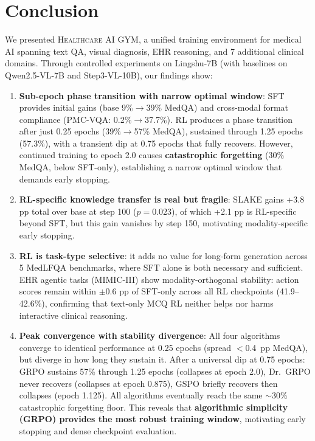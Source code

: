 \documentclass{article}
\newcommand{\gym}{\textsc{Healthcare AI GYM}}
\begin{document}
\section{Conclusion}
\label{sec:conclusion}

We presented \gym{}, a unified training environment for medical AI spanning text QA, visual diagnosis, EHR reasoning, and 7 additional clinical domains. Through controlled experiments on Lingshu-7B (with baselines on Qwen2.5-VL-7B and Step3-VL-10B), our findings show:

\begin{enumerate}[nosep, leftmargin=*]
    \item \textbf{Sub-epoch phase transition with narrow optimal window}: SFT provides initial gains (base 9\%$\to$39\% MedQA) and cross-modal format compliance (PMC-VQA: 0.2\%$\to$37.7\%). RL produces a phase transition after just 0.25 epochs (39\%$\to$57\% MedQA), sustained through 1.25 epochs (57.3\%), with a transient dip at 0.75 epochs that fully recovers. However, continued training to epoch 2.0 causes \textbf{catastrophic forgetting} (30\% MedQA, below SFT-only), establishing a narrow optimal window that demands early stopping.
    \item \textbf{RL-specific knowledge transfer is real but fragile}: SLAKE gains +3.8 pp total over base at step 100 ($p{=}0.023$), of which +2.1 pp is RL-specific beyond SFT, but this gain vanishes by step 150, motivating modality-specific early stopping.
    \item \textbf{RL is task-type selective}: it adds no value for long-form generation across 5 MedLFQA benchmarks, where SFT alone is both necessary and sufficient. EHR agentic tasks (MIMIC-III) show modality-orthogonal stability: action scores remain within $\pm$0.6 pp of SFT-only across all RL checkpoints (41.9--42.6\%), confirming that text-only MCQ RL neither helps nor harms interactive clinical reasoning.
    \item \textbf{Peak convergence with stability divergence}: All four algorithms converge to identical performance at 0.25 epochs (spread $<$0.4~pp MedQA), but diverge in how long they sustain it. After a universal dip at 0.75 epochs: GRPO sustains 57\% through 1.25 epochs (collapses at epoch 2.0), Dr.~GRPO never recovers (collapses at epoch 0.875), GSPO briefly recovers then collapses (epoch 1.125). All algorithms eventually reach the same ${\sim}$30\% catastrophic forgetting floor. This reveals that \textbf{algorithmic simplicity (GRPO) provides the most robust training window}, motivating early stopping and dense checkpoint evaluation.

\end{enumerate}
\end{document}
